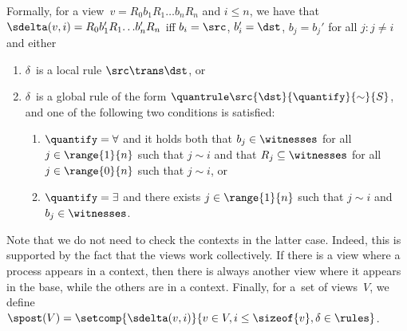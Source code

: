 Formally, for a view~$v=R_0b_1R_1{\ldots}b_nR_n$ and $i\leq n$, we
have that $\sdelta(v,i) = R_0b_1'R_1{\ldots}b_n'R_n$ %
iff %
\mbox{$b_i = \src$}, $b_i' = \dst$, $b_j=b_j'$ for all $j:j\neq i$ and
either
\begin{enumerate}[label={(\roman{*})}]
\item $\delta$~is a local rule $\src\trans\dst$, or   
\item $\delta$~is a global rule of the form
  $\quantrule\src{\dst}{\quantify}{\sim}{S}$, and one of the following
  two conditions is satisfied:
  \begin{enumerate}[label={(\alph{*})}]
  \item %
    $\quantify=\forall$ and it holds both that $b_j\in\witnesses$ for
    all $j\in\range{1}{n}$ such that $j\sim i$ and that
    $R_j\subseteq\witnesses$ for all $j\in\range{0}{n}$ such that
    $j\sim i$, or
  \item %
    $\quantify=\exists$ and there exists $j\in\range{1}{n}$ such that
    $j\sim i$ and $b_j\in\witnesses$.
  \end{enumerate}
\end{enumerate}
%
Note that we do not need to check the contexts in the latter
case. Indeed, this is supported by the fact that the views work
collectively. If there is a view where a process appears in a context,
then there is always another view where it appears in the base, while
the others are in a context.
%
%
Finally, for a~set of views~$V$, we define $\spost(V) =
\setcomp{\sdelta(v,i)}{ v \in V, i \leq \sizeof{v}, \delta\in\rules}$.
%

